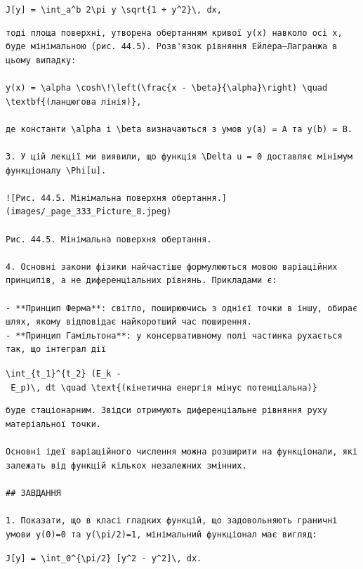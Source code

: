 \documentclass[
  ukrainian,
]{article}
\begin{document}
\texttt{J{[}y{]}\ =\ \textbackslash{}int\_a\^{}b\ 2\textbackslash{}pi\ y\ \textbackslash{}sqrt\{1\ +\ y\textquotesingle{}\^{}2\}\textbackslash{},\ dx,}

\begin{verbatim}
тоді площа поверхні, утворена обертанням кривої y(x) навколо осі x, буде мінімальною (рис. 44.5). Розв'язок рівняння Ейлера–Лагранжа в цьому випадку:

y(x) = \alpha \cosh\!\left(\frac{x - \beta}{\alpha}\right) \quad \textbf{(ланцюгова лінія)},

де константи \alpha і \beta визначаються з умов y(a) = A та y(b) = B.

3. У цій лекції ми виявили, що функція \Delta u = 0 доставляє мінімум функціоналу \Phi[u].

![Рис. 44.5. Мінімальна поверхня обертання.](images/_page_333_Picture_8.jpeg)

Рис. 44.5. Мінімальна поверхня обертання.

4. Основні закони фізики найчастіше формулюються мовою варіаційних принципів, а не диференціальних рівнянь. Прикладами є:

- **Принцип Ферма**: світло, поширюючись з однієї точки в іншу, обирає шлях, якому відповідає найкоротший час поширення.
- **Принцип Гамільтона**: у консервативному полі частинка рухається так, що інтеграл дії
\end{verbatim}

\texttt{\textbackslash{}int\_\{t\_1\}\^{}\{t\_2\}\ (E\_k\ -\ E\_p)\textbackslash{},\ dt\ \textbackslash{}quad\ \textbackslash{}text\{(кінетична\ енергія\ мінус\ потенціальна)\}}

\begin{verbatim}
буде стаціонарним. Звідси отримують диференціальне рівняння руху матеріальної точки.

Основні ідеї варіаційного числення можна розширити на функціонали, які залежать від функцій кількох незалежних змінних.

## ЗАВДАННЯ

1. Показати, що в класі гладких функцій, що задовольняють граничні умови y(0)=0 та y(\pi/2)=1, мінімальний функціонал має вигляд:
\end{verbatim}

\texttt{J{[}y{]}\ =\ \textbackslash{}int\_0\^{}\{\textbackslash{}pi/2\}\ {[}y\textquotesingle{}\^{}2\ -\ y\^{}2{]}\textbackslash{},\ dx.}
\end{document}
